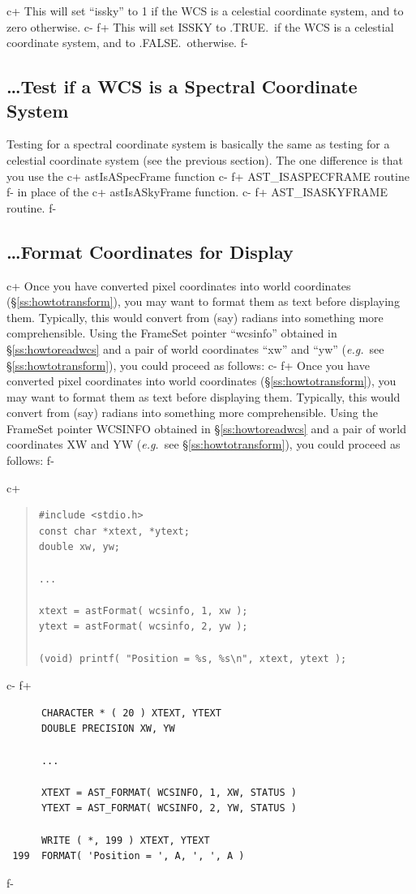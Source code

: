 \documentclass[twoside,11pt]{article}
\newcommand{\secref}[1]{\S\ref{#1}}
\newcommand{\secref}[1]{\ref{#1}}
\begin{document}
c+
This will set ``issky'' to 1 if the WCS is a celestial coordinate
system, and to zero otherwise.
c-
f+
This will set ISSKY to .TRUE.\ if the WCS is a celestial coordinate
system, and to .FALSE.\ otherwise.
f-

\subsection{\label{ss:howtotestforspectral}\ldots Test if a WCS is a Spectral Coordinate System}
Testing for a spectral coordinate system is basically the same as testing
for a celestial coordinate system (see the previous section). The one
difference is that you use the
c+
astIsASpecFrame function
c-
f+
AST\_ISASPECFRAME routine
f-
in place of the
c+
astIsASkyFrame function.
c-
f+
AST\_ISASKYFRAME routine.
f-

\subsection{\label{ss:howtoformatcoordinates}\ldots Format Coordinates for Display}

c+
Once you have converted pixel coordinates into world coordinates
(\secref{ss:howtotransform}), you may want to format them as text
before displaying them. Typically, this would convert from (say)
radians into something more comprehensible. Using the FrameSet pointer
``wcsinfo'' obtained in \secref{ss:howtoreadwcs} and a pair of world
coordinates ``xw'' and ``yw'' ({\em{e.g.}}\ see
\secref{ss:howtotransform}), you could proceed as follows:
c-
f+
Once you have converted pixel coordinates into world coordinates
(\secref{ss:howtotransform}), you may want to format them as text
before displaying them. Typically, this would convert from (say)
radians into something more comprehensible. Using the FrameSet pointer
WCSINFO obtained in \secref{ss:howtoreadwcs} and a pair of world
coordinates XW and YW ({\em{e.g.}}\ see \secref{ss:howtotransform}),
you could proceed as follows:
f-

c+
\begin{quote}
\small
\begin{verbatim}
#include <stdio.h>
const char *xtext, *ytext;
double xw, yw;

...

xtext = astFormat( wcsinfo, 1, xw );
ytext = astFormat( wcsinfo, 2, yw );

(void) printf( "Position = %s, %s\n", xtext, ytext );
\end{verbatim}
\normalsize
\end{quote}
c-
f+
\small
\begin{verbatim}
      CHARACTER * ( 20 ) XTEXT, YTEXT
      DOUBLE PRECISION XW, YW

      ...

      XTEXT = AST_FORMAT( WCSINFO, 1, XW, STATUS )
      YTEXT = AST_FORMAT( WCSINFO, 2, YW, STATUS )

      WRITE ( *, 199 ) XTEXT, YTEXT
 199  FORMAT( 'Position = ', A, ', ', A )
\end{verbatim}
\normalsize
f-
\end{document}
